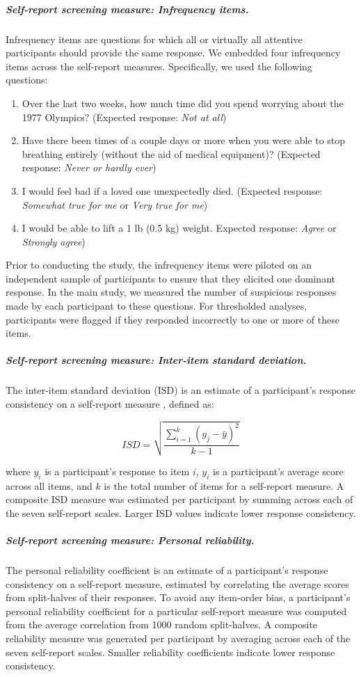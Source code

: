\documentclass[a4paper,notitlepage,12pt]{article}
\begin{document}
\subparagraph{Self-report screening measure: Infrequency items.} Infrequency items are questions for which all or virtually all attentive participants should provide the same response. We embedded four infrequency items across the self-report measures. Specifically, we used the following questions:

\begin{enumerate}
  \item Over the last two weeks, how much time did you spend worrying about the 1977 Olympics? (Expected response: \textit{Not at all})
  \item Have there been times of a couple days or more when you were able to stop breathing entirely (without the aid of medical equipment)? (Expected response: \textit{Never or hardly ever})
  \item I would feel bad if a loved one unexpectedly died. (Expected response: \textit{Somewhat true for me} or \textit{Very true for me})
  \item I would be able to lift a 1 lb (0.5 kg) weight. Expected response: \textit{Agree} or \textit{Strongly agree})
\end{enumerate}

Prior to conducting the study, the infrequency items were piloted on an independent sample of participants to ensure that they elicited one dominant response. In the main study, we measured the number of suspicious responses made by each participant to these questions. For thresholded analyses, participants were flagged if they responded incorrectly to one or more of these items.

\subparagraph{Self-report screening measure: Inter-item standard deviation.} The inter-item standard deviation (ISD) is an estimate of a participant's response consistency on a self-report measure \cite{marjanovic2015inter}, defined as:

\begin{equation*}
    ISD = \sqrt{\frac{\sum^k_{i=1}(y_j - \bar{y})^2}{k-1}}
\end{equation*}

where $y_i$ is a participant's response to item $i$, $y_i$ is a participant's average score across all  items, and $k$ is the total number of items for a self-report measure. A composite ISD measure was estimated per participant by summing across each of the seven self-report scales. Larger ISD values indicate lower response consistency.

\subparagraph{Self-report screening measure: Personal reliability.} The personal reliability coefficient is an estimate of a participant's response consistency on a self-report measure, estimated by correlating the average scores from split-halves of their responses. To avoid any item-order bias, a participant's personal reliability coefficient for a particular self-report measure was computed from the average correlation from 1000 random split-halves. A composite reliability measure was generated per participant by averaging across each of the seven self-report scales. Smaller reliability coefficients indicate lower response consistency.  
\end{document}
